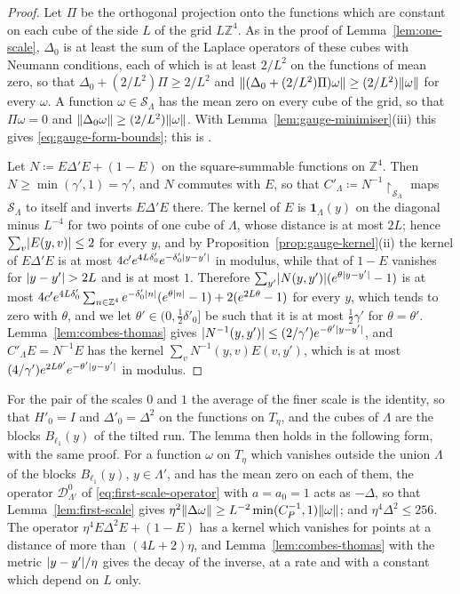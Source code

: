 \documentclass[11pt]{preprint}
\DeclarePairedDelimiter{\abs}{\lvert}{\rvert}
\DeclarePairedDelimiter{\norm}{\lVert}{\rVert}
\numberwithin{equation}{section}
\theoremstyle{definition}
\theoremstyle{remark}
\theoremstyle{plain}
\begin{document}
\begin{proof}
Let $\Pi$ be the orthogonal projection onto the functions which are constant on each cube of the side $L$ of the grid $L\mathbb Z^4$. As in the proof of Lemma~\ref{lem:one-scale}, $\Delta_0$ is at least the sum of the Laplace operators of these cubes with Neumann conditions, each of which is at least $2/L^2$ on the functions of mean zero, so that $\Delta_0 + (2/L^2)\Pi \geq 2/L^2$ and $\norm{(\Delta_0 + (2/L^2)\Pi)\omega} \geq (2/L^2)\norm\omega$ for every $\omega$. A function $\omega \in \mathcal S_\Lambda$ has the mean zero on every cube of the grid, so that $\Pi\omega = 0$ and $\norm{\Delta_0\omega} \geq (2/L^2)\norm\omega$. With Lemma~\ref{lem:gauge-minimiser}(iii) this gives \eqref{eq:gauge-form-bounds}; this is \cite[(2.110)]{BalabanPRT2}.

Let $N \coloneqq E\Delta'E + (1 - E)$ on the square-summable functions on $\mathbb Z^4$. Then $N \geq \min(\gamma', 1) = \gamma'$, and $N$ commutes with $E$, so that $C'_\Lambda \coloneqq N^{-1}\restriction_{\mathcal S_\Lambda}$ maps $\mathcal S_\Lambda$ to itself and inverts $E\Delta'E$ there. The kernel of $E$ is $\mathbf 1_\Lambda(y)$ on the diagonal minus $L^{-4}$ for two points of one cube of $\Lambda$, whose distance is at most $2L$; hence $\sum_v\abs{E(y, v)} \leq 2$ for every $y$, and by Proposition~\ref{prop:gauge-kernel}(ii) the kernel of $E\Delta'E$ is at most $4c'e^{4L\delta'_0}e^{-\delta'_0\abs{y - y'}}$ in modulus, while that of $1 - E$ vanishes for $\abs{y - y'} > 2L$ and is at most $1$. Therefore $\sum_{y'}\abs{N(y, y')}(e^{\theta\abs{y - y'}} - 1)$ is at most $4c'e^{4L\delta'_0}\sum_{n \in \mathbb Z^4}e^{-\delta'_0\abs n}(e^{\theta\abs n} - 1) + 2(e^{2L\theta} - 1)$ for every $y$, which tends to zero with $\theta$, and we let $\theta' \in (0, \frac12\delta'_0]$ be such that it is at most $\frac12\gamma'$ for $\theta = \theta'$. Lemma~\ref{lem:combes-thomas} gives $\abs{N^{-1}(y, y')} \leq (2/\gamma')e^{-\theta'\abs{y - y'}}$, and $C'_\Lambda E = N^{-1}E$ has the kernel $\sum_vN^{-1}(y, v)E(v, y')$, which is at most $(4/\gamma')e^{2L\theta'}e^{-\theta'\abs{y - y'}}$ in modulus.
\end{proof}

For the pair of the scales $0$ and $1$ the average of the finer scale is the identity, so that $H'_0 = I$ and $\Delta'_0 = \Delta^2$ on the functions on $T_\eta$, and the cubes of $\Lambda$ are the blocks $B_{\ell_1}(y)$ of the tilted run. The lemma then holds in the following form, with the same proof. For a function $\omega$ on $T_\eta$ which vanishes outside the union $\Lambda$ of the blocks $B_{\ell_1}(y)$, $y \in \Lambda'$, and has the mean zero on each of them, the operator $\mathcal D^0_{\Lambda'}$ of \eqref{eq:first-scale-operator} with $a = a_0 = 1$ acts as $-\Delta$, so that Lemma~\ref{lem:first-scale} gives $\eta^2\norm{\Delta\omega} \geq L^{-2}\min(C_P^{-1}, 1)\norm\omega$; and $\eta^4\Delta^2 \leq 256$. The operator $\eta^4E\Delta^2E + (1 - E)$ has a kernel which vanishes for points at a distance of more than $(4L + 2)\eta$, and Lemma~\ref{lem:combes-thomas} with the metric $\abs{y - y'}/\eta$ gives the decay of the inverse, at a rate and with a constant which depend on $L$ only.
\end{document}
